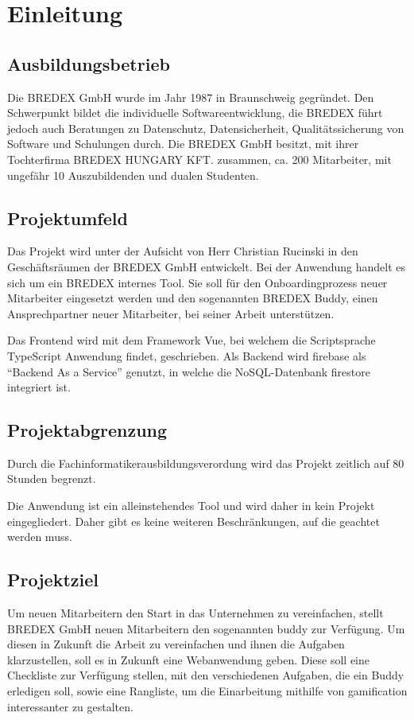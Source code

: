 \documentclass[11pt]{article}
\begin{document}
%
%
                    
\section{Einleitung}
                    
\subsection{Ausbildungsbetrieb}
Die BREDEX GmbH wurde im Jahr 1987 in Braunschweig gegründet. Den Schwerpunkt 
bildet die individuelle Softwareentwicklung, die BREDEX führt jedoch auch 
Beratungen zu Datenschutz, Datensicherheit, Qualitätssicherung von Software 
und Schulungen durch. Die BREDEX GmbH besitzt, mit ihrer Tochterfirma BREDEX 
HUNGARY KFT. zusammen, ca. 200 Mitarbeiter, mit ungefähr 10 Auszubildenden und dualen Studenten.  %

\subsection{Projektumfeld}
Das Projekt wird unter der Aufsicht von Herr Christian Rucinski in den 
Geschäftsräumen der BREDEX GmbH entwickelt. Bei der Anwendung handelt es sich 
um ein BREDEX internes Tool. Sie soll für den Onboardingprozess neuer Mitarbeiter 
eingesetzt werden und den sogenannten BREDEX Buddy, einen Ansprechpartner 
neuer Mitarbeiter, bei seiner Arbeit unterstützen. 

Das Frontend wird mit dem Framework Vue, bei welchem die Scriptsprache TypeScript 
Anwendung findet, geschrieben. Als Backend wird \gls{firebase} als “Backend As a Service” 
genutzt, in welche die NoSQL-Datenbank \gls{firestore} integriert ist.

\subsection{Projektabgrenzung}
Durch die Fachinformatikerausbildungsverordung wird das Projekt zeitlich auf 80 
Stunden begrenzt.  

Die Anwendung ist ein alleinstehendes Tool und wird daher in kein Projekt 
eingegliedert. Daher gibt es keine weiteren Beschränkungen, auf die geachtet 
werden muss.  

\subsection{Projektziel}
Um neuen Mitarbeitern den Start in das Unternehmen zu vereinfachen, stellt BREDEX GmbH neuen Mitarbeitern
den sogenannten \gls{buddy} zur Verfügung. Um diesen in Zukunft die Arbeit zu vereinfachen und ihnen die Aufgaben klarzustellen,
soll es in Zukunft eine Webanwendung geben. Diese soll eine Checkliste zur Verfügung stellen, mit den verschiedenen Aufgaben, die ein
Buddy erledigen soll, sowie eine Rangliste, um die Einarbeitung mithilfe von \Gls{gamification} interessanter zu gestalten.
\end{document}
